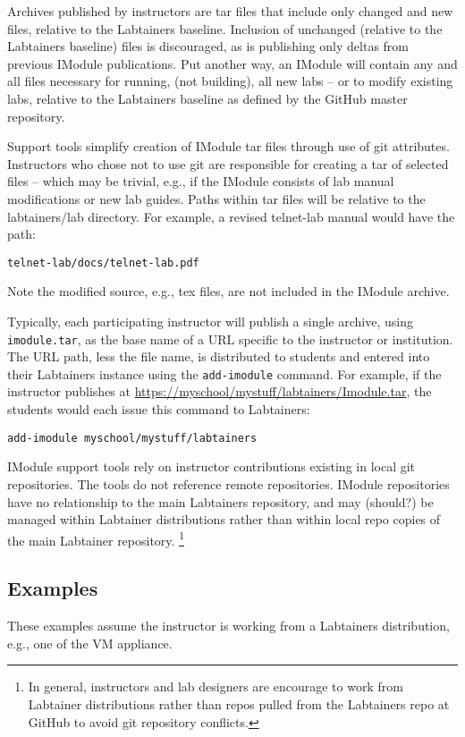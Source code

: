 \documentclass[12pt]{article}
\begin{document}
Archives published by instructors are tar files that include only changed and new files,
relative to the Labtainers baseline.  Inclusion of unchanged (relative to the 
Labtainers baseline) files is discouraged, as is publishing only deltas from previous
IModule publications.  Put another way, an IModule will contain any 
and all files
necessary for running, (not building), all new labs -- or to modify existing labs, 
relative to the Labtainers baseline as defined by the GitHub master repository.

Support tools simplify creation of IModule tar files through use of git attributes.
Instructors who chose not to use git are responsible for creating a tar of selected
files -- which may be trivial, e.g., if the IModule consists of lab manual modifications
or new lab guides.  Paths within tar files will be relative to the labtainers/lab
directory.  For example, a revised telnet-lab manual would have the path:
\begin{verbatim}
telnet-lab/docs/telnet-lab.pdf
\end{verbatim}
\noindent Note the modified source, e.g., tex files, are not included in the IModule
archive.

Typically, each participating instructor will publish a single archive, using
{\tt imodule.tar}, as the base name of a URL specific to the instructor or institution. The URL path, 
less the file name, is distributed to students and entered into their Labtainers 
instance using the {\tt add-imodule} command.  For example, if the instructor publishes
at \url{https://myschool/mystuff/labtainers/Imodule.tar}, the students would each issue
this command to Labtainers:
\begin{verbatim}
add-imodule myschool/mystuff/labtainers
\end{verbatim} 

IModule support tools rely on instructor contributions existing in local git repositories.
The tools do not reference remote repositories.  IModule repositories have no relationship
to the main Labtainers repository, and may (should?) be managed within Labtainer
distributions rather than within local repo copies of the main Labtainer repository.   \footnote{In general,
instructors and lab designers are encourage to work from Labtainer distributions rather
than repos pulled from the Labtainers repo at GitHub to avoid git repository conflicts.}

\subsection {Examples}  
These examples assume the instructor is working from a Labtainers distribution, e.g., one
of the VM appliance.
\end{document}
